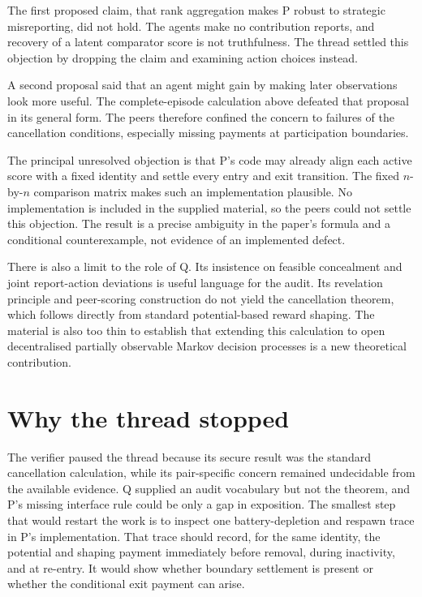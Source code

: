 \documentclass{article}
\begin{document}
The first proposed claim, that rank aggregation makes P robust to strategic misreporting, did not hold.  The agents make no contribution reports, and recovery of a latent comparator score is not truthfulness.  The thread settled this objection by dropping the claim and examining action choices instead.

A second proposal said that an agent might gain by making later observations look more useful.  The complete-episode calculation above defeated that proposal in its general form.  The peers therefore confined the concern to failures of the cancellation conditions, especially missing payments at participation boundaries.

The principal unresolved objection is that P's code may already align each active score with a fixed identity and settle every entry and exit transition.  The fixed \(n\)-by-\(n\) comparison matrix makes such an implementation plausible.  No implementation is included in the supplied material, so the peers could not settle this objection.  The result is a precise ambiguity in the paper's formula and a conditional counterexample, not evidence of an implemented defect.

There is also a limit to the role of Q.  Its insistence on feasible concealment and joint report-action deviations is useful language for the audit.  Its revelation principle and peer-scoring construction do not yield the cancellation theorem, which follows directly from standard potential-based reward shaping.  The material is also too thin to establish that extending this calculation to open decentralised partially observable Markov decision processes is a new theoretical contribution.

\section{Why the thread stopped}

The verifier paused the thread because its secure result was the standard cancellation calculation, while its pair-specific concern remained undecidable from the available evidence.  Q supplied an audit vocabulary but not the theorem, and P's missing interface rule could be only a gap in exposition.  The smallest step that would restart the work is to inspect one battery-depletion and respawn trace in P's implementation.  That trace should record, for the same identity, the potential and shaping payment immediately before removal, during inactivity, and at re-entry.  It would show whether boundary settlement is present or whether the conditional exit payment can arise.



\end{document}
